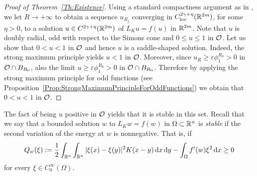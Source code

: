 \begin{proof}[Proof of Theorem~\ref{Th:Existence}]
	Using a standard compactness argument as in \cite{FelipeSanz-Perela:IntegroDifferentialI}, we let $R\to +\infty$ to obtain a sequence $u_{R_j}$ converging in $C^{2\gamma + \eta}_{\mathrm{loc}}(\mathbb{R}^{2m})$, for some $\eta > 0$, to a solution $u \in C^{2\gamma + \eta}(\mathbb{R}^{2m})$ of $L_K u = f(u)$ in $\mathbb{R}^{2m}$. Note that $u$ is doubly radial, odd with respect to the Simons cone and $0\leq u \leq 1$ in $\mathcal{O}$. Let us show that $0 < u < 1$ in $\mathcal{O}$ and hence $u$ is a saddle-shaped solution. Indeed, the strong maximum principle yields $u<1$ in $\mathcal{O}$. Moreover, since $u_R\geq\varepsilon \phi_1^{R_0}>0$ in  $\mathcal{O} \cap B_{R_0}$, also the limit $u\geq\varepsilon \phi_1^{R_0}>0$ in  $\mathcal{O} \cap B_{R_0}$. Therefore by applying the strong maximum principle for odd functions (see Proposition~\ref{Prop:StrongMaximumPrincipleForOddFunctions}) we obtain that $0 < u < 1$ in $\mathcal{O}$.
\end{proof}




The fact of being $u$ positive in $\mathcal{O}$ yields that it is stable in this set. Recall that we say that a bounded solution $w$ to $L_K w = f(w)$ in $\Omega\subset \mathbb{R}^n$ is \emph{stable} if the second variation of the energy at $w$ is nonnegative. That is, if
\begin{equation}
	\label{Eq:StablityCondition}	
	Q_w(\xi) := \dfrac{1}{2} \int_{\mathbb{R}^n} \int_{\mathbb{R}^n} |\xi (x) - \xi(y)|^2 K(x - y) \,\mathrm{d} x \,\mathrm{d} y - \int_{\Omega} f'(w) \xi^2 \,\mathrm{d} x \geq 0
\end{equation}
for every $\xi \in C^\infty_0 (\Omega)$.



